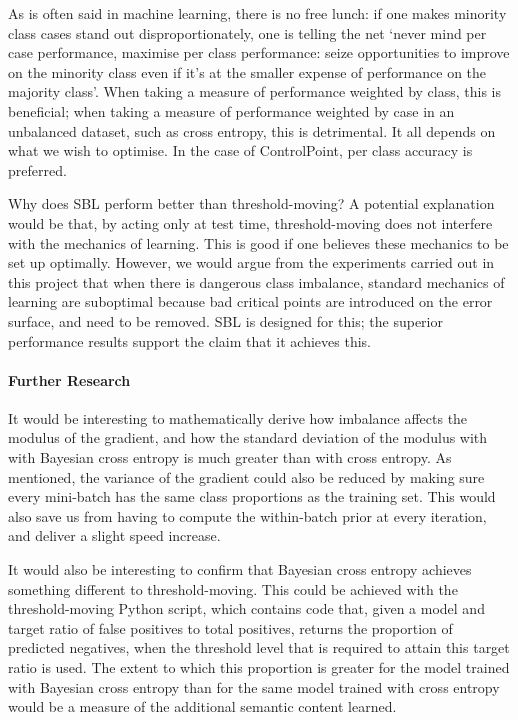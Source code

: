 \documentclass[a4paper,11pt]{article}
\begin{document}
As is often said in machine learning, there is no free lunch: if one makes minority class cases stand out disproportionately, one is telling the net `never mind per case performance, maximise per class performance: seize opportunities to improve on the minority class even if it's at the smaller expense of performance on the majority class'. When taking a measure of performance weighted by class, this is beneficial; when taking a measure of performance weighted by case in an unbalanced dataset, such as cross entropy, this is detrimental. It all depends on what we wish to optimise. In the case of ControlPoint, per class accuracy is preferred.

Why does SBL perform better than threshold-moving? A potential explanation would be that, by acting only at test time, threshold-moving does not interfere with the mechanics of learning. This is good if one believes these mechanics to be set up optimally. However, we would argue from the experiments carried out in this project that when there is dangerous class imbalance, standard mechanics of learning are suboptimal because bad critical points are introduced on the error surface, and need to be removed. SBL is designed for this; the superior performance results support the claim that it achieves this. \\ 


\paragraph{Further Research}

It would be interesting to mathematically derive how imbalance affects the modulus of the gradient, and how the standard deviation of the modulus with  with Bayesian cross entropy is much greater than with cross entropy. As mentioned, the variance of the gradient could also be reduced by making sure every mini-batch has the same class proportions as the training set. This would also save us from having to compute the within-batch prior at every iteration, and deliver a slight speed increase.  

It would also be interesting to confirm that Bayesian cross entropy achieves something different to threshold-moving. This could be achieved with the threshold-moving Python script, which contains code that, given a model and target ratio of false positives to total positives, returns the proportion of predicted negatives, when the threshold level that is required to attain this target ratio is used. The extent to which this proportion is greater for the model trained with Bayesian cross entropy than for the same model trained with cross entropy would be a measure of the additional semantic content learned.
\end{document}
